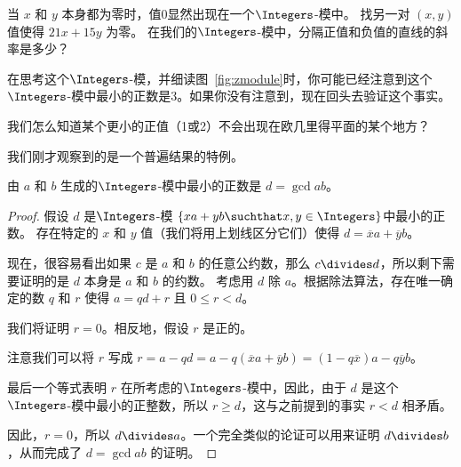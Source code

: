 \begin{exer}     
      当 $x$ 和 $y$ 本身都为零时，值0显然出现在一个$\Integers$-模中。    
      找另一对 $(x,y)$ 值使得 $21x+15y$ 为零。
      在我们的$\Integers$-模中，分隔正值和负值的直线的斜率是多少？
\end{exer}

在思考这个$\Integers$-模，并细读图~\ref{fig:zmodule}时，你可能已经注意到这个$\Integers$-模中最小的正数是3。如果你没有注意到，现在回头去验证这个事实。

\begin{exer}
      我们怎么知道某个更小的正值（1或2）不会出现在欧几里得平面的某个地方？
\end{exer}

我们刚才观察到的是一个普遍结果的特例。

\begin{thm} \label{gcduniqueexists}
      由 $a$ 和 $b$ 生成的$\Integers$-模中最小的正数是 $d = \gcd{a}{b}$。
\end{thm}

\begin{proof}
      假设 $d$ 是$\Integers$-模 $\{ xa + yb \suchthat x,y \in \Integers \}$中最小的正数。
      存在特定的 $x$ 和 $y$ 值（我们将用上划线区分它们）使得 $d = \overline{x}a + \overline{y}b$。

      现在，很容易看出如果 $c$ 是 $a$ 和 $b$ 的任意公约数，那么 $c \divides d$，所以剩下需要证明的是 $d$ 本身是 $a$ 和 $b$ 的约数。  
      考虑用 $d$ 除 $a$。根据除法算法，存在唯一确定的数 $q$ 和 $r$ 使得 $a =qd + r$ 且 $0 \leq r < d$。

      我们将证明 $r=0$。相反地，假设 $r$ 是正的。

      注意我们可以将 $r$ 写成 $r = a - qd = a - q(\overline{x}a + \overline{y}b) = (1-q\overline{x})a - q\overline{y}b$。

      最后一个等式表明 $r$ 在所考虑的$\Integers$-模中，因此，由于 $d$ 是这个$\Integers$-模中最小的正整数，所以 $r \geq d$，这与之前提到的事实 $r < d$ 相矛盾。

      因此，$r=0$，所以 $d \divides a$。一个完全类似的论证可以用来证明 $d \divides b$，从而完成了 $d = \gcd{a}{b}$ 的证明。
\end{proof}


\clearpage







%
%

